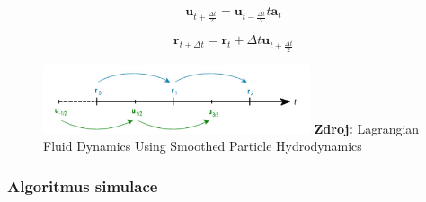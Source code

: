 \begin{equation}
	\mathbf{u}_{t + \frac{\Delta t}{2}} = \mathbf{u}_{t - \frac{\Delta t}{2}} t \mathbf{a}_t
	\label{eq:LeapVel}
\end{equation}

\begin{equation}
	\mathbf{r}_{t + \Delta t} = \mathbf{r}_t + \Delta t \mathbf{u}_{t + \frac{\Delta t}{2}}
	\label{eq:LeapPos}
\end{equation}

\begin{figure}[hbt]
	\centering
	\captionsetup{justification=centering}
	\includegraphics[width=0.7\textwidth]{obrazky-figures/leapFrog.PNG}
	\textbf{Zdroj: } Lagrangian Fluid Dynamics Using Smoothed Particle Hydrodynamics \cite{KelagerSPH}
	\label{fig:LeapFrog}
\end{figure}

\newpage

\subsubsection{Algoritmus simulace}

